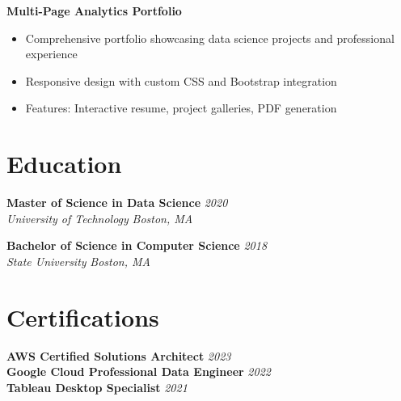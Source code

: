 \documentclass[letterpaper,11pt]{article}
\begin{document}
\textbf{Multi-Page Analytics Portfolio}
\begin{itemize}[leftmargin=0.5in]
    \item Comprehensive portfolio showcasing data science projects and professional experience
    \item Responsive design with custom CSS and Bootstrap integration
    \item Features: Interactive resume, project galleries, PDF generation
\end{itemize}

\section*{\textcolor{primarycolor}{Education}}

\textbf{Master of Science in Data Science} \hfill \textit{2020}\\
\textit{University of Technology} \hfill \textit{Boston, MA}

\textbf{Bachelor of Science in Computer Science} \hfill \textit{2018}\\
\textit{State University} \hfill \textit{Boston, MA}

\section*{\textcolor{primarycolor}{Certifications}}

\textbf{AWS Certified Solutions Architect} \hfill \textit{2023}\\
\textbf{Google Cloud Professional Data Engineer} \hfill \textit{2022}\\
\textbf{Tableau Desktop Specialist} \hfill \textit{2021}
\end{document}
